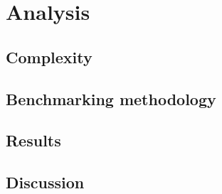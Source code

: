 \section{Analysis}

\subsection{Complexity}

\subsection{Benchmarking methodology}

\subsection{Results}

\subsection{Discussion}
